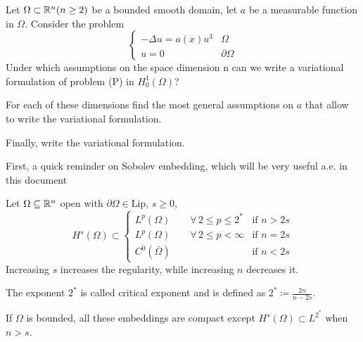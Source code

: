 \newpage
\begin{exercise}
    Let \(\Omega \subset \mathbb{R}^n (n \geq 2)\) be a bounded smooth domain, let \(a\) be a measurable function in \(\Omega\).
    Consider the problem
    \[
        \begin{cases}
            - \Delta u = a(x) u^3 & \Omega         \\
            u = 0                 & \partial\Omega
        \end{cases}
        \tag*{(P)}
    \]
    Under which assumptions on the space dimension n can we write a variational
    formulation of problem (P) in \(H^1_0(\Omega)\)?

    For each of these dimensions find the most general assumptions on \(a\) that
    allow to write the variational formulation.

    Finally, write the variational formulation.
\end{exercise}

First, a quick reminder on Sobolev embedding, which will be very useful a.e. in
this document
\begin{remark}
    Let \(\Omega \subseteq \mathbb{R}^n\) open with \(\partial\Omega \in \text{Lip}\), \(s \geq 0\),
    \[
        H^s(\Omega) \subset
        \begin{cases}
            L^p(\Omega) \qquad \forall \, 2 \leq p \leq 2^* & \text{if } n > 2s \\
            L^p(\Omega) \qquad \forall \, 2 \leq p < \infty & \text{if } n = 2s \\
            C^0(\bar{\Omega})                               & \text{if } n < 2s
        \end{cases}
    \]
    Increasing \(s\) increases the regularity, while increasing \(n\) decreases it.

    The exponent \(2^*\) is called critical exponent and is defined as \(2^*
    \coloneqq \frac{2n}{n - 2s}\).

    If \(\Omega\) is bounded, all these embeddings are compact except \(H^s(\Omega)
    \subset L^{2^*}\) when \(n > s\).
\end{remark}

